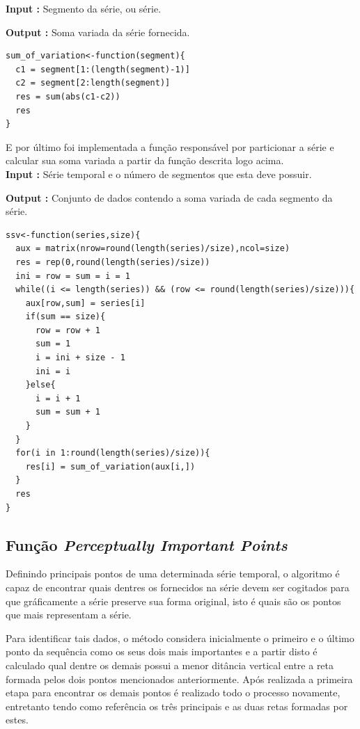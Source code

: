 \documentclass[12pt,letterpaper]{article}
\begin{document}
\textbf{Input :} Segmento da série, ou série.

\textbf{Output :} Soma variada da série fornecida.\\

 \begin{lstlisting}
sum_of_variation<-function(segment){
  c1 = segment[1:(length(segment)-1)]
  c2 = segment[2:length(segment)]
  res = sum(abs(c1-c2))
  res
}
\end{lstlisting}

E por último foi implementada a função responsável por particionar a série e calcular sua soma variada a partir da função descrita logo acima.\\

\textbf{Input :} Série temporal e o número de segmentos que esta deve possuir.

\textbf{Output :} Conjunto de dados contendo a soma variada de cada segmento da série.\\

 \begin{lstlisting}
ssv<-function(series,size){
  aux = matrix(nrow=round(length(series)/size),ncol=size)
  res = rep(0,round(length(series)/size))
  ini = row = sum = i = 1
  while((i <= length(series)) && (row <= round(length(series)/size))){
    aux[row,sum] = series[i]
    if(sum == size){
      row = row + 1
      sum = 1
      i = ini + size - 1
      ini = i
    }else{
      i = i + 1
      sum = sum + 1
    }
  }
  for(i in 1:round(length(series)/size)){
    res[i] = sum_of_variation(aux[i,])
  }
  res
}
\end{lstlisting}

\subsection{Função \textit{Perceptually Important Points}}

Definindo principais pontos de uma determinada série temporal, o algoritmo é capaz de encontrar quais dentres os fornecidos na série devem ser cogitados para que gráficamente a série preserve sua forma original, isto é quais são os pontos que mais representam a série.

Para identificar tais dados, o método considera inicialmente o primeiro e o último ponto da sequência como os seus dois mais importantes e a partir disto é calculado qual dentre os demais possui a menor ditância vertical entre a reta formada pelos dois pontos mencionados anteriormente. Após realizada a primeira etapa para encontrar os demais pontos é realizado todo o processo novamente, entretanto tendo como referência os três principais e as duas retas formadas por estes.
\end{document}
